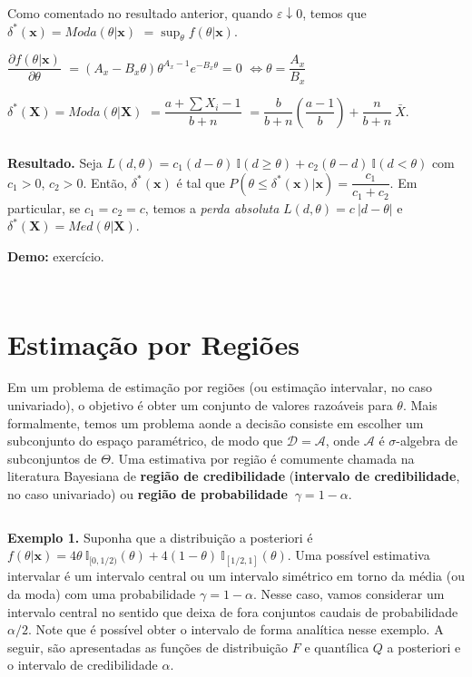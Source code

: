 \documentclass[
]{book}
\begin{document}
Como comentado no resultado anterior, quando \(\varepsilon \downarrow 0\), temos que \({\delta}^*(\boldsymbol x)=Moda(\theta|\boldsymbol x)\) \(= \displaystyle\sup_{\theta} f(\theta|\boldsymbol x)\).

\(\dfrac{\partial f(\theta|\boldsymbol x)}{\partial \theta}\) \(=(A_x-B_x\theta)\theta^{A_x-1}e^{-B_x\theta}=0\) \(\Leftrightarrow \theta =\dfrac{A_x}{B_x}\)

\({\delta}^*(\boldsymbol X) = Moda(\theta|\boldsymbol X)\) \(=\dfrac{a+\sum X_i-1}{b+n}\) \(=\dfrac{b}{b+n}\left(\dfrac{a-1}{b}\right)+\dfrac{n}{b+n}~\bar{X}\).

\(~\)

\textbf{Resultado.} Seja \(L(d,\theta)=c_1(d-\theta)~\mathbb{I}(d\geq \theta)+c_2(\theta-d)~\mathbb{I}(d<\theta)\) com \(c_1>0\), \(c_2 >0\). Então, \({\delta}^*(\boldsymbol{x})\) é tal que \(P\left(\theta\leq {\delta}^*(\boldsymbol{x})\big|\boldsymbol x\right)=\dfrac{c_1}{c_1+c_2}\). Em particular, se \(c_1=c_2=c\), temos a \emph{perda absoluta} \(L(d,\theta)=c~|d-\theta|\) e \({\delta}^*(\boldsymbol{X})=Med(\theta|\boldsymbol X)\).

\textbf{Demo:} exercício.

\(~\)

\(~\)

\hypertarget{estimauxe7uxe3o-por-regiuxf5es}{%
\section{Estimação por Regiões}\label{estimauxe7uxe3o-por-regiuxf5es}}

Em um problema de estimação por regiões (ou estimação intervalar, no caso univariado), o objetivo é obter um conjunto de valores razoáveis para \(\theta\). Mais formalmente, temos um problema aonde a decisão consiste em escolher um subconjunto do espaço paramétrico, de modo que \(\mathcal{D}=\mathcal{A}\), onde \(\mathcal{A}\) é \(\sigma\)-algebra de subconjuntos de \(\Theta\). Uma estimativa por região é comumente chamada na literatura Bayesiana de \textbf{região de credibilidade} (\textbf{intervalo de credibilidade}, no caso univariado) ou \textbf{região de probabilidade} \(~\gamma=1-\alpha\).

\(~\)

\textbf{Exemplo 1.} Suponha que a distribuição a posteriori é \(f(\theta|\boldsymbol{x})=4\theta~\mathbb{I}_{[0,1/2)}(\theta)+4(1-\theta)~\mathbb{I}_{[1/2,1]}(\theta)\). Uma possível estimativa intervalar é um intervalo central ou um intervalo simétrico em torno da média (ou da moda) com uma probabilidade \(\gamma = 1-\alpha\). Nesse caso, vamos considerar um intervalo central no sentido que deixa de fora conjuntos caudais de probabilidade \(\alpha/2\). Note que é possível obter o intervalo de forma analítica nesse exemplo. A seguir, são apresentadas as funções de distribuição \(F\) e quantílica \(Q\) a posteriori e o intervalo de credibilidade \(\alpha\).
\end{document}

